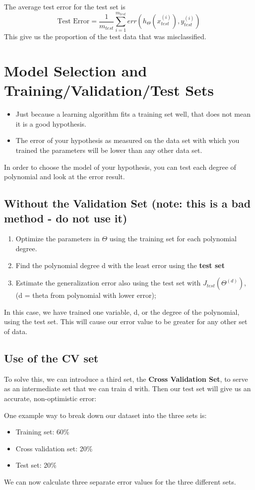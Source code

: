 The average test error for the test set is
\[
\text{Test Error} = \dfrac{1}{m_{test}} \sum^{m_{test}}_{i=1} err(h_\Theta(x^{(i)}_{test}), y^{(i)}_{test})
\]
This give us the proportion of the test data that was misclassified.

\section{Model Selection and Training/Validation/Test Sets}
\begin{itemize}
\item Just because a learning algorithm fits a training set well, that does not mean it is a good hypothesis.
\item The error of your hypothesis as measured on the data set with which you trained the parameters will be lower than any other data set.
\end{itemize}

In order to choose the model of your hypothesis, you can test each degree of polynomial and look at the error result.

\subsection{Without the Validation Set (note: this is a bad method - do not use it)}
\begin{enumerate}
\item Optimize the parameters in $\Theta$ using the training set for each polynomial degree.
\item Find the polynomial degree d with the least error using the \textbf{test set}
\item Estimate the generalization error also using the test set with $J_{test}(\Theta^{(d)})$, (d = theta from polynomial with lower error);
\end{enumerate}
In this case, we have trained one variable, d, or the degree of the polynomial, using the test set. This will cause our error value to be greater for any other set of data.
\subsection{Use of the CV set}
To solve this, we can introduce a third set, the \textbf{Cross Validation Set}, to serve as an intermediate set that we can train d with. Then our test set will give us an accurate, non-optimistic error:

One example way to break down our dataset into the three sets is:
\begin{itemize}
\item Training set: 60\%
\item Cross validation set: 20\%
\item Test set: 20\%

\end{itemize}
We can now calculate three separate error values for the three different sets.

